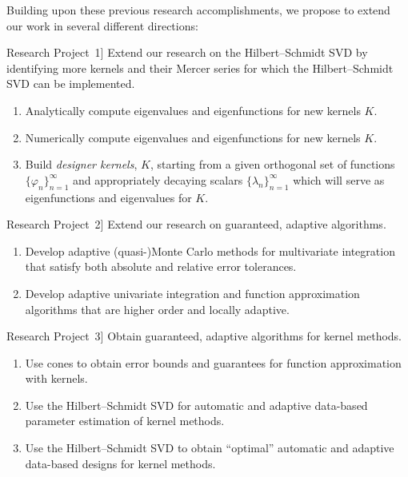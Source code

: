 \documentclass[11pt]{NSFamsart}
\newcommand{\refproba}{\hyperref[SectHSSVD]{Research Project~1}}
\newcommand{\refprobb}{\hyperref[SectGAIL]{Research Project~2}}
\newcommand{\refprobc}{\hyperref[combinesec]{Research Project~3}}
\begin{document}
Building upon these previous research accomplishments, we propose to extend our work in several different directions:

\begin{description}[leftmargin=2.5ex]

\item[\refproba] Extend our research on the Hilbert--Schmidt SVD by identifying more kernels and their Mercer series for which the Hilbert--Schmidt SVD can be implemented.
\begin{enumerate}
\renewcommand{\labelenumi}{1.\arabic{enumi}.}
\item Analytically compute eigenvalues and eigenfunctions for new kernels $K$.
\item Numerically compute eigenvalues and eigenfunctions for new kernels $K$.
\item Build \emph{designer kernels}, $K$, starting from a given orthogonal set of functions $\{\varphi_n\}_{n=1}^\infty$ and appropriately decaying scalars $\{\lambda_n\}_{n=1}^\infty$ which will serve as eigenfunctions and eigenvalues for $K$.
\end{enumerate}

\item[\refprobb] Extend our research on guaranteed, adaptive algorithms.
\begin{enumerate}
\renewcommand{\labelenumi}{2.\arabic{enumi}.}
\item Develop adaptive (quasi-)Monte Carlo methods for multivariate integration that satisfy both absolute and relative error tolerances.
\item Develop adaptive univariate integration and function approximation algorithms that are higher order and locally adaptive.
\end{enumerate}

\item[\refprobc] Obtain guaranteed, adaptive algorithms for kernel methods.
\begin{enumerate}
\renewcommand{\labelenumi}{3.\arabic{enumi}.}
\item Use cones to obtain error bounds and guarantees for function approximation with kernels.
\item Use the Hilbert--Schmidt SVD for automatic and adaptive data-based parameter estimation of kernel methods.
\item Use the Hilbert--Schmidt SVD to obtain ``optimal'' automatic and adaptive data-based designs for kernel methods.
\end{enumerate}


\end{description}
\end{document}
